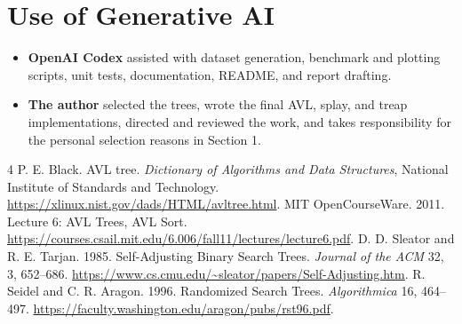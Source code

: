 \documentclass[acmsmall,nonacm]{acmart}
\begin{document}
\section*{Use of Generative AI}
\begin{itemize}
\item \textbf{OpenAI Codex} assisted with dataset generation, benchmark and plotting scripts, unit tests, documentation, README, and report drafting.
\item \textbf{The author} selected the trees, wrote the final AVL, splay, and treap implementations, directed and reviewed the work, and takes responsibility for the personal selection reasons in Section 1.
\end{itemize}

\begin{thebibliography}{4}
 P. E. Black. AVL tree. \emph{Dictionary of Algorithms and Data Structures}, National Institute of Standards and Technology. \url{https://xlinux.nist.gov/dads/HTML/avltree.html}.
 MIT OpenCourseWare. 2011. Lecture 6: AVL Trees, AVL Sort. \url{https://courses.csail.mit.edu/6.006/fall11/lectures/lecture6.pdf}.
 D. D. Sleator and R. E. Tarjan. 1985. Self-Adjusting Binary Search Trees. \emph{Journal of the ACM} 32, 3, 652--686. \url{https://www.cs.cmu.edu/~sleator/papers/Self-Adjusting.htm}.
 R. Seidel and C. R. Aragon. 1996. Randomized Search Trees. \emph{Algorithmica} 16, 464--497. \url{https://faculty.washington.edu/aragon/pubs/rst96.pdf}.
\end{thebibliography}
\end{document}
